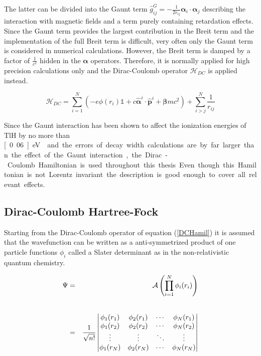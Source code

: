 The latter can be divided into the Gaunt term
$\hat{g}_{ij}^G = - \frac1{2r_{ij}}\boldsymbol{\alpha}_i\cdot\boldsymbol{\alpha}_j$
describing the interaction
with magnetic fields and a term purely containing retardation effects.
Since the Gaunt term provides the largest contribution in the Breit term and the
implementation of the full Breit term is difficult, very often only the Gaunt term
is considered in numerical calculations.
However, the Breit term is damped by a factor of $\frac 1{c^2}$ hidden in the
$\boldsymbol{\alpha}$ operators. Therefore, it is normally applied
for high precision calculations
only and the Dirac-Coulomb operator $\mathcal{H}_{DC}$ is applied instead.

\begin{equation}\label{DCHamil}
\mathcal{H}_{DC} = \sum\limits_{i=1}^N (-e \phi(r_i)\mathds{1}+c\hat{\boldsymbol{\alpha}}^{i}\cdot\hat{\mathbf{p}}^{i}+\boldsymbol{\beta}mc^2) + \sum\limits_{i>j}^N \frac1{r_{ij}}
\end{equation}


Since the Gaunt interaction has been shown to affect the ionization energies of
TlH by no more than \unit[0.06]{eV} \cite{Pernpointner05} and the errors of
decay width calculations
are by far larger than the effect of the
Gaunt interaction, the Dirac-Coulomb Hamiltonian is used throughout this thesis.
Even though this Hamiltonian is not Lorentz invariant the description is good
enough to cover all relevant effects.

\subsection{Dirac-Coulomb Hartree-Fock}
Starting from the Dirac-Coulomb operator of equation (\ref{DCHamil}) it is assumed
that the wavefunction can be written as a anti-symmetrized product of one particle
functions $\phi_i$ called a Slater determinant as in the
non-relativistic quantum chemistry.

\begin{eqnarray}
\Psi &=& \mathcal{A} \left(\prod\limits_{i=1}^N\phi_i(r_i)\right)\\\vphantom{\rule{0pt}{50pt}}
     &=& \frac1{\sqrt{n!}}\begin{vmatrix}
\phi_1(r_1) & \phi_2(r_1) & \cdots & \phi_N(r_1)\\
\phi_1(r_2) & \phi_2(r_2) & \cdots & \phi_N(r_2)\\
\vdots      & \vdots     & \ddots  & \vdots\\
\phi_1(r_N) & \phi_2(r_N) & \cdots & \phi_N(r_N)\\
\end{vmatrix}
\end{eqnarray}

